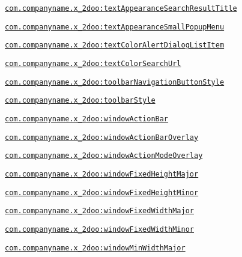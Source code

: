 {\tt \hyperlink{classandroid_1_1support_1_1v4_1_1_r_1_1styleable_81d84885678ba9df1805cb1815d7317c}{com.companyname.x\_\-2doo:textAppearanceSearchResultTitle}}

{\tt \hyperlink{classandroid_1_1support_1_1v4_1_1_r_1_1styleable_49d918bd91325c5f25bb709c1dfaf57c}{com.companyname.x\_\-2doo:textAppearanceSmallPopupMenu}}

{\tt \hyperlink{classandroid_1_1support_1_1v4_1_1_r_1_1styleable_6a0419e5a5e9ea88ff3f7d058fe92b7a}{com.companyname.x\_\-2doo:textColorAlertDialogListItem}}

{\tt \hyperlink{classandroid_1_1support_1_1v4_1_1_r_1_1styleable_a36f1ef204a6d05d312ba3e930404faa}{com.companyname.x\_\-2doo:textColorSearchUrl}}

{\tt \hyperlink{classandroid_1_1support_1_1v4_1_1_r_1_1styleable_87064f8d46222440c979de60d377ca13}{com.companyname.x\_\-2doo:toolbarNavigationButtonStyle}}

{\tt \hyperlink{classandroid_1_1support_1_1v4_1_1_r_1_1styleable_81c6c79a79be93a353a8d86869ec3c42}{com.companyname.x\_\-2doo:toolbarStyle}}

{\tt \hyperlink{classandroid_1_1support_1_1v4_1_1_r_1_1styleable_8831994a0d23fc63a5a2b0ebf86c8780}{com.companyname.x\_\-2doo:windowActionBar}}

{\tt \hyperlink{classandroid_1_1support_1_1v4_1_1_r_1_1styleable_924250499a476f5492258c6e60c451f7}{com.companyname.x\_\-2doo:windowActionBarOverlay}}

{\tt \hyperlink{classandroid_1_1support_1_1v4_1_1_r_1_1styleable_1edd340eee109030db65f7a0873156ea}{com.companyname.x\_\-2doo:windowActionModeOverlay}}

{\tt \hyperlink{classandroid_1_1support_1_1v4_1_1_r_1_1styleable_bf982bf851eb06a495f5ea786cf2972e}{com.companyname.x\_\-2doo:windowFixedHeightMajor}}

{\tt \hyperlink{classandroid_1_1support_1_1v4_1_1_r_1_1styleable_b7b787b3482486bcf6134e26f3f79737}{com.companyname.x\_\-2doo:windowFixedHeightMinor}}

{\tt \hyperlink{classandroid_1_1support_1_1v4_1_1_r_1_1styleable_307ec462d988be66e4bf9bd5ef416bc4}{com.companyname.x\_\-2doo:windowFixedWidthMajor}}

{\tt \hyperlink{classandroid_1_1support_1_1v4_1_1_r_1_1styleable_0de992b88b66a205f256dcedf020c78e}{com.companyname.x\_\-2doo:windowFixedWidthMinor}}

{\tt \hyperlink{classandroid_1_1support_1_1v4_1_1_r_1_1styleable_73b62d7534ce501813e6dcf984016df4}{com.companyname.x\_\-2doo:windowMinWidthMajor}}

